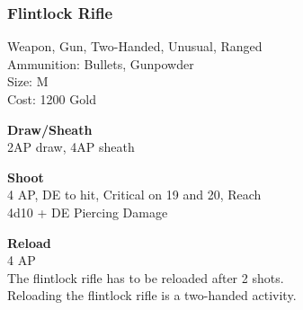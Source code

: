 \subsubsection{Flintlock Rifle}\label{weapon:flintlockRifle}
Weapon, Gun, Two-Handed, Unusual, Ranged\\
Ammunition: Bullets, Gunpowder\\
Size: M\\
Cost: 1200 Gold

\textbf{Draw/Sheath} \\
2AP draw, 4AP sheath

\textbf{Shoot} \\
4 AP, DE to hit, Critical on 19 and 20,  Reach\\
4d10 + DE Piercing Damage

\textbf{Reload} \\
4 AP\\
The flintlock rifle has to be reloaded after 2 shots.\\
Reloading the flintlock rifle is a two-handed activity.
